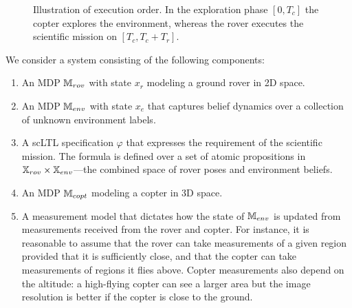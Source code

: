 \documentclass[conference]{IEEEtran}
\begin{document}
\begin{figure}
	\begin{center}
	\end{center}
	\caption{Illustration of execution order. In the exploration phase $[0, T_c]$ the copter explores the environment, whereas the rover executes the scientific mission on $[T_c, T_c + T_r]$.}
	\label{fig:execorder}
\end{figure}

We consider a system consisting of the following components:
\begin{enumerate}
	\item An MDP $\mathbb{M}_{rov}$ with state $x_r$ modeling a ground rover in 2D space.
	\item An MDP $\mathbb{M}_{env}$ with state $x_e$ that captures belief dynamics over a collection of unknown environment labels.
	\item A scLTL specification $\varphi$ that expresses the requirement of the scientific mission. The formula is defined over a set of atomic propositions in $\mathbb{X}_{rov} \times \mathbb{X}_{env}$---the combined space of rover poses and environment beliefs. 
	\item An MDP $\mathbb{M}_{copt}$ modeling a copter in 3D space.
	\item A measurement model that dictates how the state of $\mathbb{M}_{env}$ is updated from measurements received from the rover and copter. For instance, it is reasonable to assume that the rover can take measurements of a given region provided that it is sufficiently close, and that the copter can take measurements of regions it flies above. Copter measurements also depend on the altitude: a high-flying copter can see a larger area but the image resolution is better if the copter is close to the ground.    
\end{enumerate}
\end{document}
